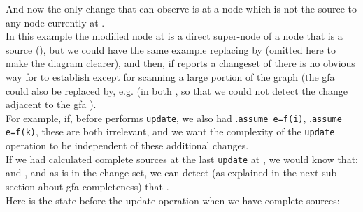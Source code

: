 And now the only change that  can observe is at a node which is not the source to any node currently at .\\
In this example the modified node at  is a direct super-node of a node that is a source (),
but we could have the same example replacing  by  (omitted here to make the diagram clearer), 
and then, if  reports a changeset of  there is no obvious way for  to establish  except for scanning a large portion of the graph  (the gfa  could also be replaced by, e.g.  (in both , so that we could not detect the change adjacent to the gfa ).\\
For example, if, before  performs \lstinline{update}, 
we also had .\lstinline{assume e=f(i)},  .\lstinline{assume e=f(k)}, these are both irrelevant, and we want the complexity of the \lstinline{update} operation to be independent of these additional changes.\\
If we had calculated complete sources at the last \lstinline{update} at , we would know that:\\
 and ,
and as  is in the change-set, we can detect (as explained in the next sub section about gfa completeness) that 
.\\
Here is the state before the update operation when we have complete sources:
